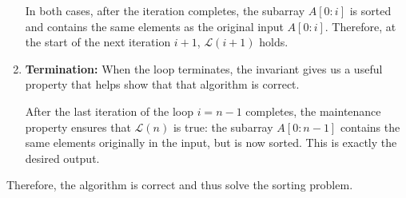 \documentclass[12pt]{article}
\begin{document}
\begin{enumerate}
    In both cases, after the iteration completes, the subarray \(A[0 : i]\) is sorted and contains the same elements as the original input \(A[0 : i]\). Therefore, at the start of the next iteration \(i+1\), \(\mathcal{L}(i+1)\) holds.

    \item \textbf{Termination:} When the loop terminates, the invariant gives us a useful property that helps show that that algorithm is correct.

    After the last iteration of the loop \(i = n-1\) completes, the maintenance property ensures that \(\mathcal{L}(n)\) is true: the subarray \(A[0 : n-1]\) contains the same elements originally in the input, but is now sorted. This is exactly the desired output.
\end{enumerate}

Therefore, the algorithm is correct and thus solve the sorting problem.
\end{document}
